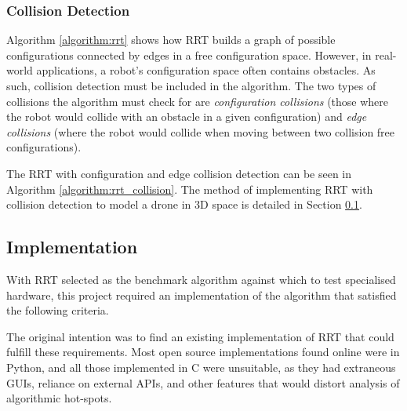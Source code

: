         

    \subsubsection{Collision Detection}

        Algorithm \ref{algorithm:rrt} shows how \gls{RRT} builds a graph of possible \gls{configuration}s connected by edges in a free \gls{configuration} space. However, in real-world applications, a robot's \gls{configuration} space often contains obstacles. As such, collision detection must be included in the algorithm. The two types of collisions the algorithm must check for are \textit{configuration collisions} (those where the robot would collide with an obstacle in a given \gls{configuration}) and \textit{edge collisions} (where the robot would collide when moving between two collision free \gls{configuration}s).

        The RRT with \gls{configuration} and edge collision detection can be seen in Algorithm \ref{algorithm:rrt_collision}. The method of implementing \gls{RRT} with collision detection to model a drone in 3D space is detailed in Section \ref{section:implementation}.

        

\newpage
\subsection{Implementation}\label{section:implementation}
    
    With \gls{RRT} selected as the benchmark algorithm against which to test specialised hardware, this project required an implementation of the algorithm that satisfied the following criteria.

    

    The original intention was to find an existing implementation of RRT that could fulfill these requirements. Most open source implementations found online were in Python, and all those implemented in C were unsuitable\cite{RoboJackets2019}\cite{Planning2019}\cite{Sourishg2017}\cite{Vss2sn2019}, as they had extraneous \gls{GUI}s, reliance on external \gls{API}s, and other features that would distort analysis of algorithmic hot-spots.


